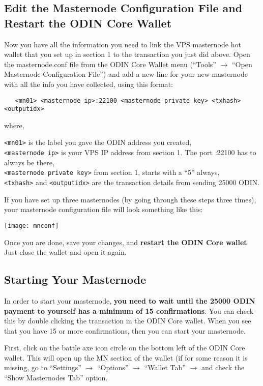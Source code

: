 \documentclass[rmp,12pt,notitlepage]{revtex4-1}
\begin{document}
\subsection{Edit the Masternode Configuration File and Restart the ODIN Core Wallet}
Now you have all the information you need to link the VPS masternode hot wallet that you set up in section 1 to the transaction you just did above. Open the masternode.conf file from the ODIN Core Wallet menu (``Tools'' $\rightarrow$ ``Open Masternode Configuration File'') and add a new line for your new masternode with all the info you have collected, using this format:
\begin{verbatim}
   <mn01> <masternode ip>:22100 <masternode private key> <txhash> <outputidx>
\end{verbatim}
where,

\verb|<mn01>| is the label you gave the ODIN address you created,  \\
\verb|<masternode ip>| is your VPS IP address from section 1. The port :22100 has to always be there, \\
\verb|<masternode private key>| from section 1, starts with a ``5'' always,\\
\verb|<txhash>| and \verb|<outputidx>| are the transaction details from sending \num{25000} ODIN.

If you have set up three masternodes (by going through these steps three times), your masternode configuration file will look something like this:
\begin{center}
   \texttt{[image: mnconf]}
\end{center}
Once you are done, save your changes, and \textbf{restart the ODIN Core wallet}. Just close the wallet and open it again.

\subsection{Starting Your Masternode}
In order to start your masternode, \textbf{you need to wait until the \num{25000} ODIN payment to yourself has a minimum of 15 confirmations}.  You can check this by double clicking the transaction in the ODIN Core wallet.  When you see that you have 15 or more confirmations, then you can start your masternode.

First, click on the battle axe icon circle on the bottom left of the ODIN Core wallet.  This will open up the MN section of the wallet (if for some reason it is missing, go to ``Settings'' $\rightarrow$ ``Options'' $\rightarrow$ ``Wallet Tab'' $\rightarrow$ and check the ``Show Masternodes Tab'' option.  
\end{document}
